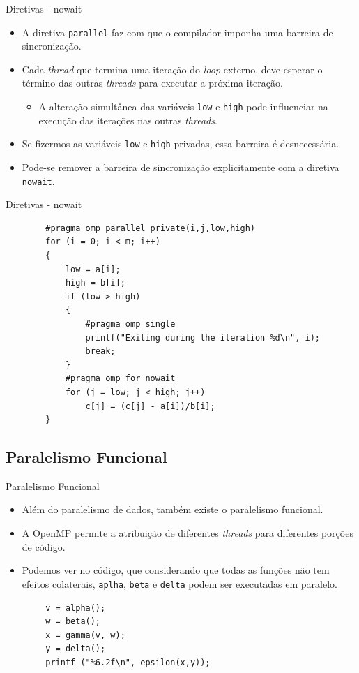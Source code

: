 \begin{frame}{Diretivas - nowait}
	\begin{itemize}
		\item A diretiva \texttt{parallel} faz com que o compilador imponha uma barreira de sincronização.
		\medskip
		\item Cada \textit{thread} que termina uma iteração do \textit{loop} externo, deve esperar o término das outras \textit{threads} para executar a próxima iteração.
		\smallskip
		\begin{itemize}
			\item A alteração simultânea das variáveis \texttt{low} e \texttt{high} pode influenciar na execução das iterações nas outras \textit{threads}.
		\end{itemize}
		\medskip
		\item Se fizermos as variáveis \texttt{low} e \texttt{high} privadas, essa barreira é desnecessária.
		\medskip
		\item Pode-se remover a barreira de sincronização explicitamente com a diretiva \texttt{nowait}.
	\end{itemize}
\end{frame}

\begin{frame}[fragile]{Diretivas - nowait}
		\begin{verbatim}
		#pragma omp parallel private(i,j,low,high)
		for (i = 0; i < m; i++)
		{
			low = a[i];
			high = b[i];
			if (low > high)
			{
				#pragma omp single
				printf("Exiting during the iteration %d\n", i);
				break;
			}
			#pragma omp for nowait
			for (j = low; j < high; j++)
				c[j] = (c[j] - a[i])/b[i];
		}
		\end{verbatim}
\end{frame}

\subsection{Paralelismo Funcional}

\begin{frame}[fragile]{Paralelismo Funcional}
	\begin{itemize}
		\item Além do paralelismo de dados, também existe o paralelismo funcional.
		\medskip
		\item A OpenMP permite a atribuição de diferentes \textit{threads} para diferentes porções de código.
		\medskip
		\item Podemos ver no código, que considerando que todas as funções não tem efeitos colaterais, \texttt{aplha}, \texttt{beta} e \texttt{delta} podem ser executadas em paralelo.
	\end{itemize}
	\begin{verbatim}
		v = alpha();
		w = beta();
		x = gamma(v, w);
		y = delta();
		printf ("%6.2f\n", epsilon(x,y));
	\end{verbatim}
\end{frame}
	
